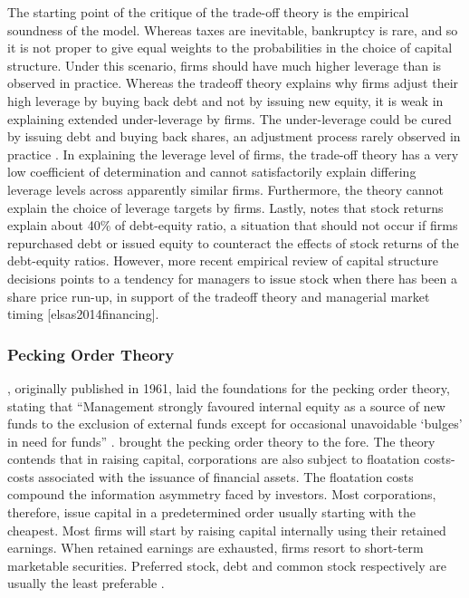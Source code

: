 \documentclass[a4paper,nobind]{templates/ociamthesis}
\begin{document}
The starting point of the critique of the trade-off theory is the empirical soundness of the model. Whereas taxes are inevitable, bankruptcy is rare, and so it is not proper to give equal weights to the probabilities in the choice of capital structure. Under this scenario, firms should have much higher leverage than is observed in practice. Whereas the tradeoff theory explains why firms adjust their high leverage by buying back debt and not by issuing new equity, it is weak in explaining extended under-leverage by firms. The under-leverage could be cured by issuing debt and buying back shares, an adjustment process rarely observed in practice \autocite{myers1984capital}.
In explaining the leverage level of firms, the trade-off theory has a very low coefficient of determination and cannot satisfactorily explain differing leverage levels across apparently similar firms. Furthermore, the theory cannot explain the choice of leverage targets by firms. Lastly, \textcite{welch2004capital} notes that stock returns explain about 40\% of debt-equity ratio, a situation that should not occur if firms repurchased debt or issued equity to counteract the effects of stock returns of the debt-equity ratios. However, more recent empirical review of capital structure decisions points to a tendency for managers to issue stock when there has been a share price run-up, in support of the tradeoff theory and managerial market timing {[}elsas2014financing{]}.

\hypertarget{pecking-order-theory}{%
\subsubsection{Pecking Order Theory}\label{pecking-order-theory}}

\noindent \textcite{donaldson2000corporate}, originally published in 1961, laid the foundations for the pecking order theory, stating that ``Management strongly favoured internal equity as a source of new funds to the exclusion of external funds except for occasional unavoidable `bulges' in need for funds'' \autocite{myers1984capital}. \textcite{myers1984corporate} brought the pecking order theory to the fore. The theory contends that in raising capital, corporations are also subject to floatation costs- costs associated with the issuance of financial assets. The floatation costs compound the information asymmetry faced by investors. Most corporations, therefore, issue capital in a predetermined order usually starting with the cheapest. Most firms will start by raising capital internally using their retained earnings. When retained earnings are exhausted, firms resort to short-term marketable securities. Preferred stock, debt and common stock respectively are usually the least preferable \autocite{chirinko2000testing,fama2002testing}.
\end{document}
